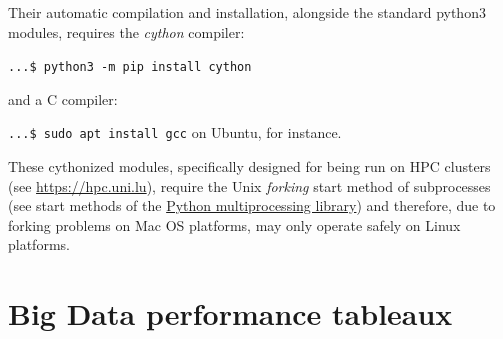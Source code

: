 Their automatic compilation and installation, alongside the standard \Digraph python3 modules, requires the \emph{cython} compiler:

\texttt{...\$ python3 -m pip install cython}

\noindent and a C compiler:

\texttt{...\$ sudo apt install gcc} on Ubuntu, for instance.

These cythonized modules, specifically designed for being run on HPC clusters (see \href{https://hpc.uni.lu}{https://hpc.uni.lu}), require the Unix \emph{forking} start method of subprocesses (see start methods of the \href{https://docs.python.org/3/library/multiprocessing.html#contexts-and-start-methods}{Python multiprocessing library})  and therefore, due to forking problems on Mac OS platforms, may only operate safely on Linux platforms.

\section{Big Data performance tableaux}
\label{sec:11.2}

